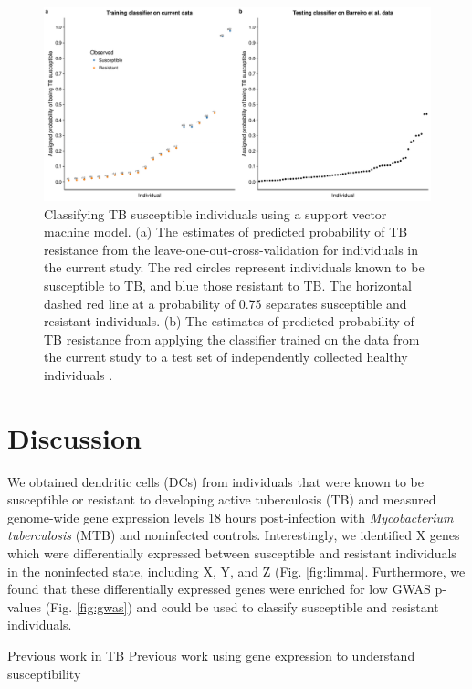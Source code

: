 \documentclass[fleqn,10pt]{wlscirep}
\begin{document}
\begin{figure}[ht]
\centering
\includegraphics[width=\linewidth]{../figure/classifier-svm.pdf}
\caption{
Classifying TB susceptible individuals using a support vector machine
model. (a) The estimates of predicted probability of TB resistance
from the leave-one-out-cross-validation for individuals in the current
study. The red circles represent individuals known to be susceptible
to TB, and blue those resistant to TB. The horizontal dashed red line
at a probability of 0.75 separates susceptible and resistant
individuals. (b) The estimates of predicted probability of TB
resistance from applying the classifier trained on the data from the
current study to a test set of independently collected healthy
individuals \cite{Barreiro2012}.
}
\label{fig:classifier}
\end{figure}

\section*{Discussion}

We obtained dendritic cells (DCs) from individuals that were known to
be susceptible or resistant to developing active tuberculosis (TB) and
measured genome-wide gene expression levels 18 hours post-infection
with \emph{Mycobacterium tuberculosis} (MTB) and noninfected controls.
Interestingly, we identified X genes which were differentially
expressed between susceptible and resistant individuals in the
noninfected state, including X, Y, and Z (Fig. \ref{fig:limma}.
Furthermore, we found that these differentially expressed genes were
enriched for low GWAS p-values (Fig. \ref{fig:gwas}) and could be used
to classify susceptible and resistant individuals.

Previous work in TB \cite{Thuong2008}
Previous work using gene expression to understand susceptibility
\cite{Bryant2014}
\end{document}
